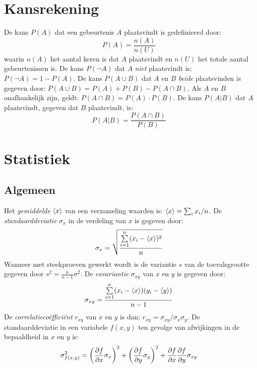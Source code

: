 \section{Kansrekening}
De kans $P(A)$ dat een gebeurtenis $A$ plaatsvindt is gedefinieerd door:
\[
P(A)=\frac{n(A)}{n(U)}
\]
waarin $n(A)$ het aantal keren is dat $A$ plaatsvindt en $n(U)$ het totale
aantal gebeurtenissen is.
\npar
De kans $P(\neg A)$ dat $A$ {\it niet} plaatsvindt is: $P(\neg A)=1-P(A)$.
De kans $P(A\cup B)$ dat $A$ en $B$ {\it beide} plaatsvinden is gegeven door:
$P(A\cup B)=P(A)+P(B)-P(A\cap B)$. Als $A$ en $B$ onafhankelijk zijn, geldt:
$P(A\cap B)=P(A)\cdot P(B)$.
\npar
De kans $P(A|B)$ dat $A$ plaatsvindt, gegeven dat $B$ plaatsvindt, is:
\[
P(A|B)=\frac{P(A\cap B)}{P(B)}
\]

\section{Statistiek}
\subsection{Algemeen}
Het {\it gemiddelde} $\left\langle x \right\rangle$ van een verzameling waarden is: $\left\langle x \right\rangle=\sum_i x_i/n$.
De {\it standaarddeviatie} $\sigma_x$ in de verdeling van $x$ is gegeven door:
\[
\sigma_x=\sqrt{\frac{\sum\limits_{i=1}^n(x_i-\left\langle x \right\rangle)^2}{n}}
\]
Wanneer met steekproeven gewerkt wordt is de variantie $s$ van de toevalsgrootte
gegeven door $\displaystyle s^2=\frac{n}{n-1}\sigma^2$.
\npar
De {\it covariantie} $\sigma_{xy}$ van $x$ en $y$ is gegeven door:
\[
\sigma_{xy}=\frac{\sum\limits_{i=1}^n(x_i-\left\langle x \right\rangle)(y_i-\left\langle y \right\rangle)}{n-1}
\]
De {\it correlatieco\"effici\"ent} $r_{xy}$ van $x$ en $y$ is dan:
$r_{xy}=\sigma_{xy}/\sigma_x\sigma_y$.
\npar
De standaarddeviatie in een variabele $f(x,y)$ ten gevolge van afwijkingen in
de bepaaldheid in $x$ en $y$ is:
\[
\sigma^2_{f(x,y)}=\left(\frac{\partial f}{\partial x}\sigma_x\right)^2+\left(\frac{\partial f}{\partial y}\sigma_y\right)^2+
\frac{\partial f}{\partial x}\frac{\partial f}{\partial y}\sigma_{xy}
\]

